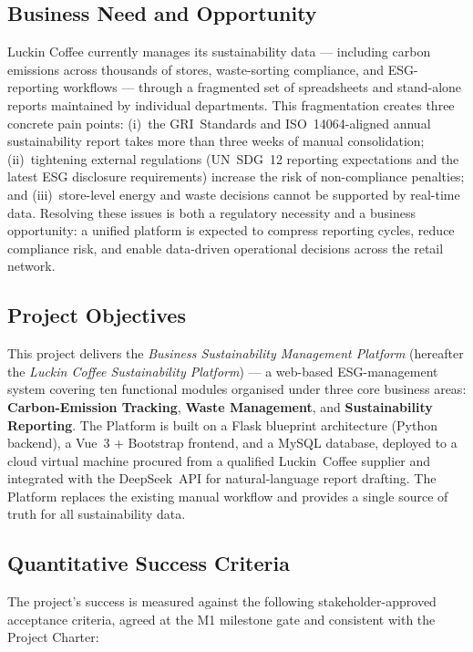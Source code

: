 \documentclass[12pt,a4paper]{article}
\begin{document}
\subsection*{Business Need and Opportunity}

Luckin Coffee currently manages its sustainability data --- including carbon emissions across thousands of stores, waste-sorting compliance, and ESG-reporting workflows --- through a fragmented set of spreadsheets and stand-alone reports maintained by individual departments. This fragmentation creates three concrete pain points: (i)~the GRI~Standards and ISO~14064-aligned annual sustainability report takes more than three weeks of manual consolidation; (ii)~tightening external regulations (UN~SDG~12 reporting expectations and the latest ESG disclosure requirements) increase the risk of non-compliance penalties; and (iii)~store-level energy and waste decisions cannot be supported by real-time data. Resolving these issues is both a regulatory necessity and a business opportunity: a unified platform is expected to compress reporting cycles, reduce compliance risk, and enable data-driven operational decisions across the retail network.

\subsection*{Project Objectives}

This project delivers the \textit{Business Sustainability Management Platform} (hereafter the \textit{Luckin Coffee Sustainability Platform}) --- a web-based ESG-management system covering ten functional modules organised under three core business areas: \textbf{Carbon-Emission Tracking}, \textbf{Waste Management}, and \textbf{Sustainability Reporting}. The Platform is built on a Flask blueprint architecture (Python backend), a Vue~3 + Bootstrap frontend, and a MySQL database, deployed to a cloud virtual machine procured from a qualified Luckin~Coffee supplier and integrated with the DeepSeek~API for natural-language report drafting. The Platform replaces the existing manual workflow and provides a single source of truth for all sustainability data.

\subsection*{Quantitative Success Criteria}

The project's success is measured against the following stakeholder-approved acceptance criteria, agreed at the M1 milestone gate and consistent with the Project Charter:
\end{document}
